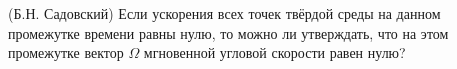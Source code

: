 (Б.Н. Садовский)
Если ускорения всех точек твёрдой среды на данном промежутке времени
равны нулю, то можно ли утверждать, что на этом промежутке вектор
$\Omega$ мгновенной угловой скорости равен нулю?
